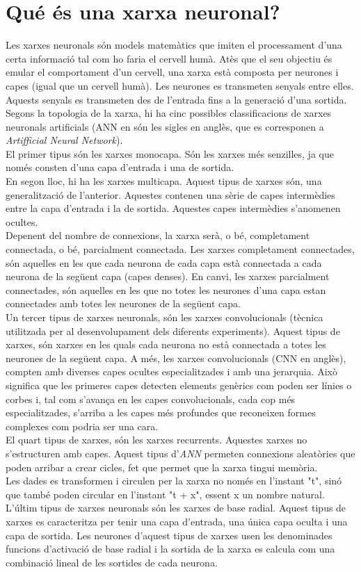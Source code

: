 \documentclass[a4paper,12pt]{report}
\begin{document}
\section*{Qué és una xarxa neuronal?}
Les xarxes neuronals són models matemàtics que imiten el processament d'una certa informació tal com ho faria el cervell humà. Atès que el seu objectiu és emular el comportament d'un cervell, una xarxa està composta per neurones i capes (igual que un cervell humà). Les neurones es transmeten senyals entre elles. Aquests senyals es transmeten des de l'entrada fins a la generació d'una sortida.\\
Segons la topologia de la xarxa, hi ha cinc possibles classificacions de xarxes neuronals artificials (ANN en són les sigles en anglès, que es corresponen a \textit{Artifficial Neural Network}).\\
El primer tipus són les xarxes monocapa. Són les xarxes més senzilles, ja que només consten d'una capa d'entrada i una de sortida.\\
En segon lloc, hi ha les xarxes multicapa. Aquest tipus de xarxes són, una generalització de l'anterior. Aquestes contenen una sèrie de capes intermèdies entre la capa d'entrada i la de sortida. Aquestes capes intermèdies s'anomenen ocultes.\\
Depenent del nombre de connexions, la xarxa serà, o bé, completament connectada, o bé, parcialment connectada. Les xarxes completament connectades, són aquelles en les que cada neurona de cada capa està connectada a cada neurona de la següent capa (capes denses). En canvi, les xarxes parcialment connectades, són aquelles en les que no totes les neurones d'una capa estan connectades amb totes les neurones de la següent capa.\\
Un tercer tipus de xarxes neuronals, són les xarxes convolucionals (tècnica utilitzada per al desenvolupament dels diferents experiments). Aquest tipus de xarxes, són xarxes en les quals cada neurona no està connectada a totes les neurones de la següent capa. A més, les xarxes convolucionals (CNN en anglès), compten amb diverses capes ocultes especialitzades i amb una jerarquia. Això significa que les primeres capes detecten elements genèrics com poden ser línies o corbes i, tal com s'avança en les capes convolucionals, cada cop més especialitzades, s'arriba a les capes més profundes que reconeixen formes complexes com podria ser una cara.\\
El quart tipus de xarxes, són les xarxes recurrents. Aquestes xarxes no s'estructuren amb capes. Aquest tipus d'\textit{ANN} permeten connexions aleatòries que poden arribar a crear cicles, fet que permet que la xarxa tingui memòria.\\
Les dades es transformen i circulen per la xarxa no només en l'instant "t", sinó que també poden circular en l'instant "t + x", essent x un nombre natural.\\
L'últim tipus de xarxes neuronals són les xarxes de base radial. Aquest tipus de xarxes es caracteritza per tenir una capa d'entrada, una única capa oculta i una capa de sortida. Les neurones d'aquest tipus de xarxes usen les denominades funcions d'activació de base radial i la sortida de la xarxa es calcula com una combinació lineal de les sortides de cada neurona.
\end{document}
